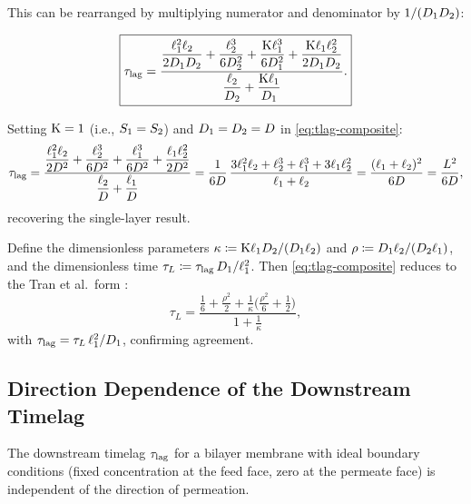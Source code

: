 This can be rearranged by multiplying numerator and denominator by
$1/(D_{1}D_{2})$:

\begin{equation}
  \label{eq:tlag-composite}
  \boxed{
  \tau_{\mathrm{lag}} = \frac{\dfrac{\ell_{1}^2\ell_{2}}{2D_{1}D_{2}}
    + \dfrac{\ell_{2}^3}{6D_{2}^2}
    + \dfrac{\mathrm{K}\ell_{1}^3}{6D_{1}^2}
    + \dfrac{\mathrm{K}\ell_{1}\ell_{2}^2}{2D_{1}D_{2}}}
  {\dfrac{\ell_{2}}{D_{2}} + \dfrac{\mathrm{K}\ell_{1}}{D_{1}}}.}
\end{equation}

\begin{remark}
Setting $\mathrm{K} = 1$ (i.e., $S_{1} = S_{2}$) and $D_{1} = D_{2} = D$
in \cref{eq:tlag-composite}:
\begin{equation}
  \tau_{\mathrm{lag}} = \frac{\dfrac{\ell_{1}^2\ell_{2}}{2D^2}
    + \dfrac{\ell_{2}^3}{6D^2}
    + \dfrac{\ell_{1}^3}{6D^2}
    + \dfrac{\ell_{1}\ell_{2}^2}{2D^2}}
  {\dfrac{\ell_{2}}{D} + \dfrac{\ell_{1}}{D}}
  = \frac{1}{6D}\,
  \frac{3\ell_{1}^2\ell_{2} + \ell_{2}^3 + \ell_{1}^3 + 3\ell_{1}\ell_{2}^2}
  {\ell_{1}+\ell_{2}}
  = \frac{(\ell_{1}+\ell_{2})^2}{6D}
  = \frac{L^2}{6D},
\end{equation}
recovering the single-layer result.
\end{remark}

\begin{remark}
\label{rem:tran-connection}
Define the dimensionless parameters $\kappa \coloneqq \mathrm{K}\ell_{1}D_{2}/
(D_{1}\ell_{2})$ and $\rho \coloneqq D_{1}\ell_{2}/(D_{2}\ell_{1})$, and the
dimensionless time $\tau_L \coloneqq \tau_{\mathrm{lag}}\,D_{1}/\ell_{1}^2$.  Then
\cref{eq:tlag-composite} reduces to the Tran et al.\ form
\cite{TranMeldonSontag2021}:
\begin{equation}
  \label{eq:tlag-TMS}
  \tau_L = \frac{\frac{1}{6} + \frac{\rho^2}{2}
    + \frac{1}{\kappa}\bigl(\frac{\rho^2}{6} + \frac{1}{2}\bigr)}
  {1 + \frac{1}{\kappa}},
\end{equation}
with $\tau_{\mathrm{lag}} = \tau_L\,\ell_{1}^2/D_{1}$, confirming agreement.
\end{remark}

\subsection{Direction Dependence of the Downstream Timelag}
\label{sec:direction-dependence}

\begin{proposition}
\label{prop:direction-independence}
The downstream timelag $\tau_{\mathrm{lag}}$ for a bilayer membrane with ideal boundary
conditions (fixed concentration at the feed face, zero at the permeate face)
is independent of the direction of permeation.
\end{proposition}

